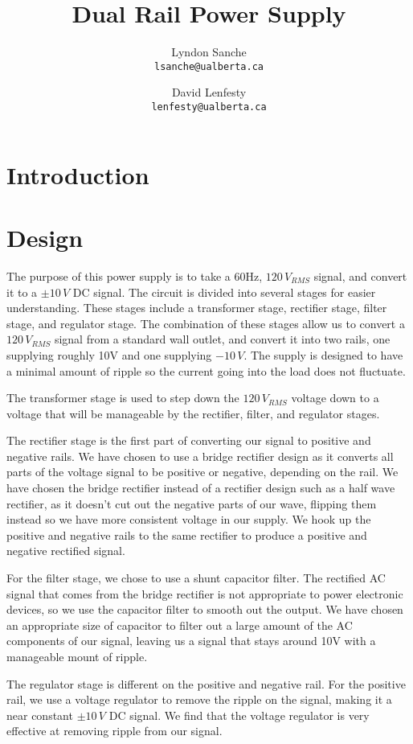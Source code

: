 \documentclass{article}
\title{Dual Rail Power Supply}
\author{
    Lyndon Sanche\\
    \texttt{lsanche@ualberta.ca}
    \and
    David Lenfesty\\
    \texttt{lenfesty@ualberta.ca}
}
\begin{document}
\maketitle
\newpage
\tableofcontents

\section{Introduction}

\section{Design}
The purpose of this power supply is to take a 60Hz, $120\,V_{RMS}$ signal, and convert it to a $\pm10\,V$ DC signal. The circuit is divided into
several stages for easier understanding. These stages include a transformer stage, rectifier stage, filter stage, and regulator stage. The combination 
of these stages allow us to convert a $120\,V_{RMS}$ signal from a standard wall outlet, and convert it into two rails, one supplying roughly 10V and one supplying $-10\,V$. 
The supply is designed to have a minimal amount of ripple so the current going into the load does not fluctuate.

The transformer stage is used to step down the $120\,V_{RMS}$ voltage down to a voltage that will be manageable by the rectifier, filter, and regulator stages.

The rectifier stage is the first part of converting our signal to positive and negative rails. We have chosen to use a bridge rectifier design as it converts all parts of the voltage signal 
to be positive or negative, depending on the rail. We have chosen the bridge rectifier instead of a rectifier design such as a half wave rectifier, as it doesn't cut out 
the negative parts of our wave, flipping them instead so we have more consistent voltage in our supply. We hook up the positive and negative rails to the same rectifier to produce a 
positive and negative rectified signal.

For the filter stage, we chose to use a shunt capacitor filter. The rectified AC signal that comes from the bridge rectifier is not appropriate to power electronic devices, so 
we use the capacitor filter to smooth out the output. We have chosen an appropriate size of capacitor to filter out a large amount of the AC components of our signal, leaving us a 
signal that stays around 10V with a manageable mount of ripple.

The regulator stage is different on the positive and negative rail. For the positive rail, we use a voltage regulator to remove the ripple on the signal, making it a 
near constant $\pm10\,V$ DC signal. We find that the voltage regulator is very effective at removing ripple from our signal.
\end{document}
